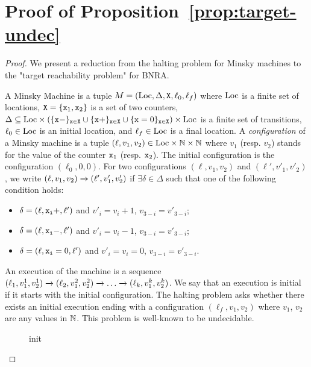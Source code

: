 \section{Proof of Proposition~\ref{prop:target-undec}}

\propTargetUndecidable*

\begin{proof}
	We present a reduction from the halting problem for Minsky machines to the "target reachability problem" for BNRA.
	
	A Minsky Machine is a tuple $M= (\text{Loc}, \Delta, \mathtt{X}, \ell_0, \ell_f)$ where $\text{Loc}$ is a finite set of locations, $\mathtt{X} = \{\mathtt{x}_1, \mathtt{x}_2\}$ is a set of two counters, $\Delta \subseteq \text{Loc} \times (\{\mathtt{\mathtt{x}}-\}_{\mathtt{x} \in \mathtt{X}} \cup \{\mathtt{\mathtt{x}}+\}_{\mathtt{x} \in \mathtt{X}} \cup \{\mathtt{\mathtt{x}}=0\}_{\mathtt{x} \in \mathtt{X}} ) \times \text{Loc}$ is a finite set of transitions, $\ell_0 \in \text{Loc}$ is an initial location, and $\ell_f \in \text{Loc}$ is a final location. A \emph{configuration} of a Minsky machine is a tuple $(\ell, v_1, v_2) \in \text{Loc} \times \mathbb{N} \times \mathbb{N}$ where $v_1$ (resp. $v_2$) stands for the value of the counter $\mathtt{x}_1$ (resp. $\mathtt{x}_2$). The initial configuration is the configuration $(\ell_0, 0, 0)$.
	For two configurations $(\ell, v_1, v_2)$ and  $(\ell', v'_1, v'_2)$, we write $(\ell, v_1, v_2) \xrightarrow{} (\ell', v'_1, v'_2)$ if $\exists \delta \in \Delta$ such that one of the following condition holds:
	\begin{itemize}
		\item $\delta = (\ell, \mathtt{\mathtt{x}_i}+, \ell')$ and $v'_i = v_i+1$, $v_{3-i} = v'_{3-i}$;
		\item $\delta = (\ell, \mathtt{\mathtt{x}_i}-, \ell')$ and $v'_i = v_i-1$, $v_{3-i} = v'_{3-i}$;
		\item $\delta = (\ell, \mathtt{\mathtt{x}_i}=0, \ell')$ and $v'_i = v_i = 0$, $v_{3-i} = v'_{3-i}$.
	\end{itemize}
	An execution of the machine is a sequence $(\ell_1, v_1^1, v_2^1) \xrightarrow{} (\ell_2, v_1^2, v_2^2) \xrightarrow{} \dots \xrightarrow{} (\ell_k, v_1^k, v_2^k)$. We say that an execution is initial if it starts with the initial configuration.
	The halting problem asks whether there exists an initial execution ending with a configuration $(\ell_f, v_1, v_2)$ where $v_1$, $v_2$ are any values in $\mathbb{N}$. This problem is well-known to be undecidable.
	
	\begin{figure}
		
		\caption{init}\label{fig:target-init}
	\end{figure}
	

\end{proof}
